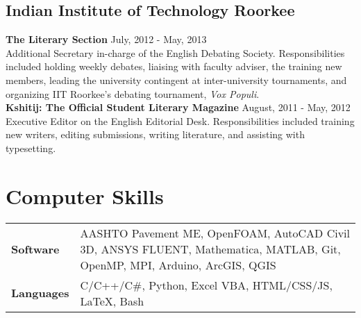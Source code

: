 \documentclass[12pt]{article}
\begin{document}
\subsection*{Indian Institute of Technology Roorkee}
\textbf{The Literary Section} \hfill July, 2012 - May, 2013\\
Additional Secretary in-charge of the English Debating Society. Responsibilities included holding weekly debates, liaising with faculty adviser, the training new members, leading the university contingent at inter-university tournaments, and organizing IIT Roorkee's debating tournament, \textit{Vox Populi}. \\

\textbf{Kshitij: The Official Student Literary Magazine} \hfill August, 2011 - May, 2012\\
Executive Editor on the English Editorial Desk. Responsibilities included training new writers, editing submissions, writing literature, and assisting with typesetting. \\

\section*{Computer Skills}
\begin{tabular}{p{10em} p{25em}} %
\textbf{Software} & AASHTO Pavement ME, OpenFOAM, AutoCAD Civil 3D, ANSYS FLUENT, Mathematica, MATLAB, Git, OpenMP, MPI, Arduino, ArcGIS, QGIS \\
\textbf{Languages} & C/C++/C\#, Python, Excel VBA, HTML/CSS/JS, \LaTeX, Bash
\end{tabular}
\end{document}
